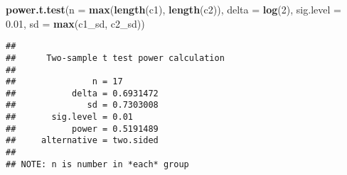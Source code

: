 \documentclass[]{article}
\newenvironment{Shaded}{\begin{snugshade}}{\end{snugshade}}
\newcommand{\KeywordTok}[1]{\textcolor[rgb]{0.13,0.29,0.53}{\textbf{{#1}}}}
\newcommand{\DataTypeTok}[1]{\textcolor[rgb]{0.13,0.29,0.53}{{#1}}}
\newcommand{\DecValTok}[1]{\textcolor[rgb]{0.00,0.00,0.81}{{#1}}}
\newcommand{\FloatTok}[1]{\textcolor[rgb]{0.00,0.00,0.81}{{#1}}}
\newcommand{\NormalTok}[1]{{#1}}
\begin{document}
\begin{Shaded}
\begin{Highlighting}[]
\KeywordTok{power.t.test}\NormalTok{(}\DataTypeTok{n =} \KeywordTok{max}\NormalTok{(}\KeywordTok{length}\NormalTok{(c1), }\KeywordTok{length}\NormalTok{(c2)),}
             \DataTypeTok{delta =} \KeywordTok{log}\NormalTok{(}\DecValTok{2}\NormalTok{),}
             \DataTypeTok{sig.level =} \FloatTok{0.01}\NormalTok{,}
             \DataTypeTok{sd =} \KeywordTok{max}\NormalTok{(c1_sd, c2_sd))}
\end{Highlighting}
\end{Shaded}

\begin{verbatim}
## 
##      Two-sample t test power calculation 
## 
##               n = 17
##           delta = 0.6931472
##              sd = 0.7303008
##       sig.level = 0.01
##           power = 0.5191489
##     alternative = two.sided
## 
## NOTE: n is number in *each* group
\end{verbatim}
\end{document}
